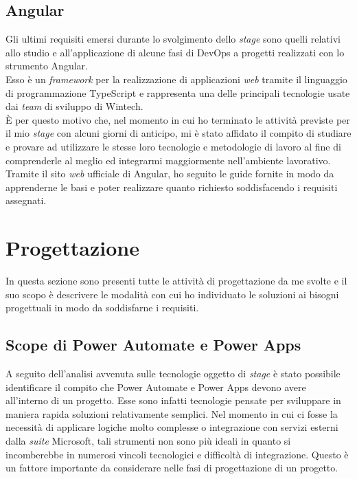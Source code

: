 \subsection{Angular}
Gli ultimi requisiti emersi durante lo svolgimento dello \emph{stage} sono quelli relativi allo studio e all'applicazione di alcune fasi di \gls{DevOps} a progetti realizzati con lo strumento Angular.\\
Esso è un \emph{framework} per la realizzazione di applicazioni \emph{web} tramite il linguaggio di programmazione TypeScript e rappresenta una delle principali tecnologie usate dai \emph{team} di sviluppo di Wintech.\\
È per questo motivo che, nel momento in cui ho terminato le attività previste per il mio \emph{stage} con alcuni giorni di anticipo, mi è stato affidato il compito di studiare e provare ad utilizzare le stesse loro tecnologie e metodologie di lavoro al fine di comprenderle al meglio ed integrarmi maggiormente nell'ambiente lavorativo.\\
Tramite il sito \emph{web} ufficiale di Angular, ho seguito le guide fornite in modo da apprenderne le basi e poter realizzare quanto richiesto soddisfacendo i requisiti assegnati.\\

\section{Progettazione}
In questa sezione sono presenti tutte le attività di progettazione da me svolte e il suo scopo è descrivere le modalità con cui ho individuato le soluzioni ai bisogni progettuali in modo da soddisfarne i requisiti.
\subsection{Scope di Power Automate e Power Apps}
A seguito dell'analisi avvenuta sulle tecnologie oggetto di \emph{stage} è stato possibile identificare il compito che Power Automate e Power Apps devono avere all'interno di un progetto. 
Esse sono infatti tecnologie pensate per sviluppare in maniera rapida soluzioni relativamente semplici. Nel momento in cui ci fosse la necessità di applicare logiche molto complesse o integrazione con servizi esterni dalla \emph{suite} Microsoft, tali strumenti non sono più ideali in quanto si incomberebbe in numerosi vincoli tecnologici e difficoltà di integrazione.
Questo è un fattore importante da considerare nelle fasi di progettazione di un progetto.\\

